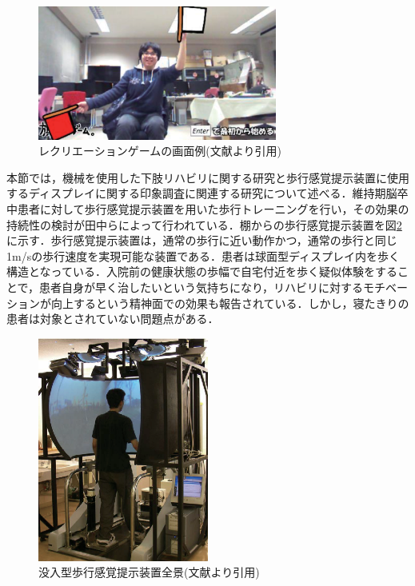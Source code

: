 \begin{figure}[tbp]
	\centering
			\includegraphics[width=0.7\textwidth]{chap1-figure/upper_limbs_system.eps}
	\caption{レクリエーションゲームの画面例(文献より引用)}
	\label{fig:upper_limbs_system}
\end{figure}


本節では，機械を使用した下肢リハビリに関する研究と歩行感覚提示装置に使用するディスプレイに関する印象調査に関連する研究について述べる．維持期脳卒中患者に対して歩行感覚提示装置を用いた歩行トレーニングを行い，その効果の持続性の検討\cite{筑波歩行感覚提示}が田中らによって行われている．棚からの歩行感覚提示装置を図\ref{fig:tukuba}に示す．歩行感覚提示装置は，通常の歩行に近い動作かつ，通常の歩行と同じ1m/sの歩行速度を実現可能な装置である．患者は球面型ディスプレイ内を歩く構造となっている．入院前の健康状態の歩幅で自宅付近を歩く疑似体験をすることで，患者自身が早く治したいという気持ちになり，リハビリに対するモチベーションが向上するという精神面での効果も報告されている．しかし，寝たきりの患者は対象とされていない問題点がある．
\fi

\begin{figure}[tbp]
	\centering
			\includegraphics[width=0.5\textwidth]{chap1-figure/tukuba.eps}
	\caption{没入型歩行感覚提示装置全景(文献\cite{筑波歩行感覚提示画像}より引用)}
	\label{fig:tukuba}
\end{figure}

